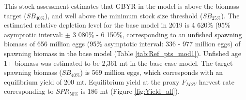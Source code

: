 \documentclass[12pt,]{article}
\begin{document}
This stock assessment estimates that GBYR in the model is above the
biomass target (\(SB_{40\%}\)), and well above the minimum stock size
threshold (\(SB_{25\%}\)). The estimated relative depletion level for
the base model in 2019 is 4 620\% (95\% asymptotic interval: \(\pm\) 3
080\% - 6 150\%, corresponding to an unfished spawning biomass of 656
million eggs (95\% asymptotic interval: 336 - 977 million eggs) of
spawning biomass in the base model (Table \ref{tab:Ref_pts_mod1}).
Unfished age 1+ biomass was estimated to be 2,361 mt in the base case
model. The target spawning biomass (\(SB_{40\%}\)) is 569 million eggs,
which corresponds with an equilibrium yield of 200 mt. Equilibrium yield
at the proxy \(F_{MSY}\) harvest rate corresponding to \(SPR_{50\%}\) is
186 mt (Figure \ref{fig:Yield_all}).

\FloatBarrier
\end{document}
